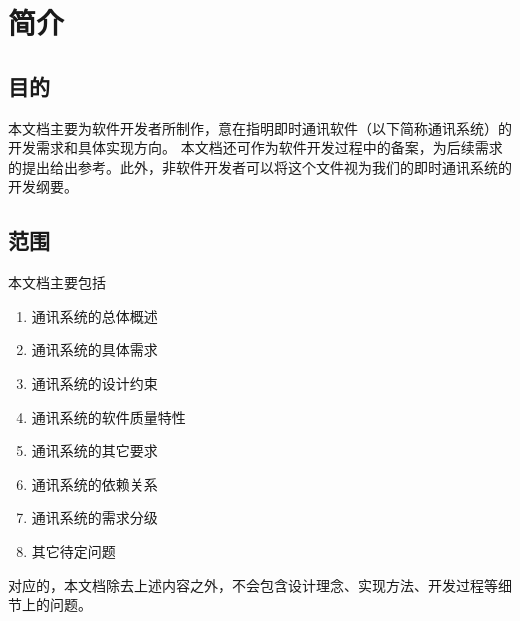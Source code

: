 \chapter{简介}
\section{目的}


本文档主要为软件开发者所制作，意在指明即时通讯软件（以下简称通讯系统）的开发需求和具体实现方向。
本文档还可作为软件开发过程中的备案，为后续需求的提出给出参考。此外，非软件开发者可以将这个文件视为我们的即时通讯系统的开发纲要。

\section{范围}


本文档主要包括
\begin{enumerate}
	\item 通讯系统的总体概述
	
	\item 通讯系统的具体需求
	
	\item 通讯系统的设计约束
	
	\item 通讯系统的软件质量特性
	
	\item 通讯系统的其它要求
	
	\item 通讯系统的依赖关系
	
	\item 通讯系统的需求分级
	
	\item 其它待定问题 
\end{enumerate}

对应的，本文档除去上述内容之外，不会包含设计理念、实现方法、开发过程等细节上的问题。

